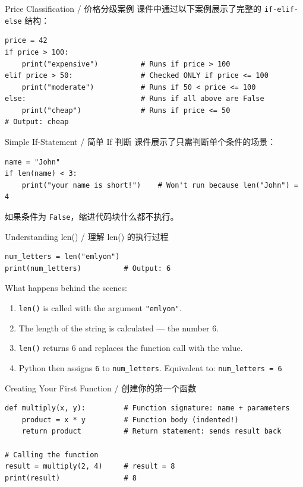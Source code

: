 \documentclass[11pt,a4paper]{report}
\let\oldtexttt\texttt
\renewcommand{\texttt}[1]{\textcolor{mainblue}{\oldtexttt{#1}}}
\begin{document}
\begin{examplebox}{Price Classification / 价格分级案例}
    课件中通过以下案例展示了完整的 \texttt{if-elif-else} 结构：
\begin{lstlisting}
price = 42
if price > 100:
    print("expensive")          # Runs if price > 100
elif price > 50:                # Checked ONLY if price <= 100
    print("moderate")           # Runs if 50 < price <= 100
else:                           # Runs if all above are False
    print("cheap")              # Runs if price <= 50
# Output: cheap
\end{lstlisting}
\end{examplebox}

\begin{examplebox}{Simple If-Statement / 简单 If 判断}
    课件展示了只需判断单个条件的场景：
\begin{lstlisting}
name = "John"
if len(name) < 3:
    print("your name is short!")    # Won't run because len("John") = 4
\end{lstlisting}
    如果条件为 \texttt{False}，缩进代码块什么都不执行。
\end{examplebox}

\begin{examplebox}{Understanding len() / 理解 len() 的执行过程}
\begin{lstlisting}
num_letters = len("emlyon")
print(num_letters)          # Output: 6
\end{lstlisting}
    What happens behind the scenes:
    \begin{enumerate}
        \item \texttt{len()} is called with the argument \texttt{"emlyon"}.
        \item The length of the string is calculated — the number 6.
        \item \texttt{len()} returns 6 and replaces the function call with the value.
        \item Python then assigns \texttt{6} to \texttt{num\_letters}. Equivalent to: \texttt{num\_letters = 6}
    \end{enumerate}
\end{examplebox}

\begin{examplebox}{Creating Your First Function / 创建你的第一个函数}
\begin{lstlisting}
def multiply(x, y):         # Function signature: name + parameters
    product = x * y         # Function body (indented!)
    return product          # Return statement: sends result back

# Calling the function
result = multiply(2, 4)     # result = 8
print(result)               # 8
\end{lstlisting}
\end{examplebox}
\end{document}
